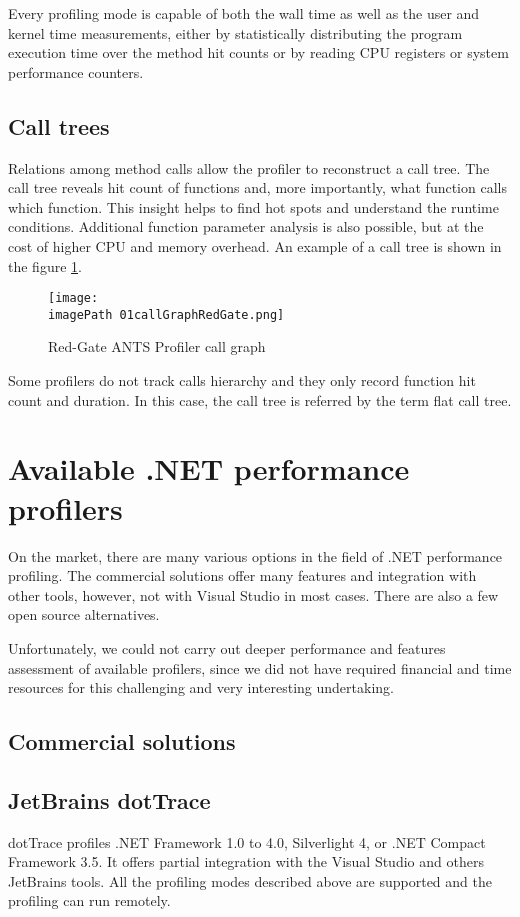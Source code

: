 Every profiling mode is capable of both the wall time as well as the user and kernel time measurements, either by statistically distributing the program execution time over the method hit counts or by reading CPU registers or system performance counters.

\subsection{Call trees}
Relations among method calls allow the profiler to reconstruct a call tree. The call tree reveals hit count of functions and, more importantly, what function calls which function. This insight helps to find hot spots and understand the runtime conditions.
Additional function parameter analysis is also possible, but at the cost of higher CPU and memory overhead. An example of a call tree is shown in the figure \ref{fig:01callGraphRedGate}.

\begin{figure}
	\centering
		\texttt{[image: \\imagePath 01callGraphRedGate.png]}
		\caption{Red-Gate ANTS Profiler call graph}
	\label{fig:01callGraphRedGate}
\end{figure}

Some profilers do not track calls hierarchy and they only record function hit count and duration. In this case, the call tree is referred by the term flat call tree.

\section{Available .NET performance profilers}
On the market, there are many various options in the field of .NET performance profiling. The commercial solutions offer many features and integration with other tools, however, not with Visual Studio in most cases. There are also a few open source alternatives.

Unfortunately, we could not carry out deeper performance and features assessment of available profilers, since we did not have required financial and time resources for this challenging and very interesting undertaking.

\subsection*{Commercial solutions}

\subsection{JetBrains dotTrace}
dotTrace profiles .NET Framework 1.0 to 4.0, Silverlight 4, or .NET Compact Framework 3.5. It offers partial integration with the Visual Studio and others JetBrains tools. All the profiling modes described above are supported and the profiling can run remotely.

